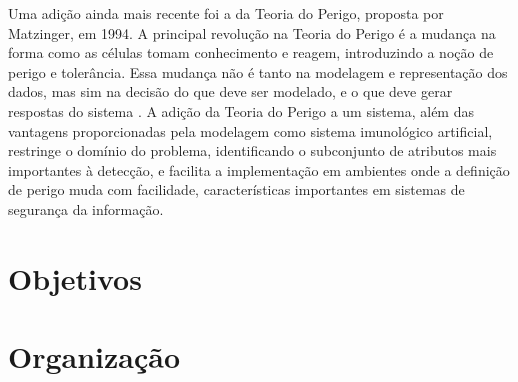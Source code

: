 Uma adição ainda mais recente foi a da Teoria do Perigo, proposta por Matzinger, em 1994. A principal revolução na Teoria do Perigo é a mudança na forma como as células tomam conhecimento e reagem, introduzindo a noção de perigo e tolerância. Essa mudança não é tanto na modelagem e representação dos dados, mas sim na decisão do que deve ser modelado, e o que deve gerar respostas do sistema \cite{Aickelin2005}. A adição da Teoria do Perigo a um sistema, além das vantagens proporcionadas pela modelagem como sistema imunológico artificial, restringe o domínio do problema, identificando o subconjunto de atributos mais importantes à detecção, e facilita a implementação em ambientes onde a definição de perigo muda com facilidade, características importantes em sistemas de segurança da informação.

\section{Objetivos}
\section{Organização}

